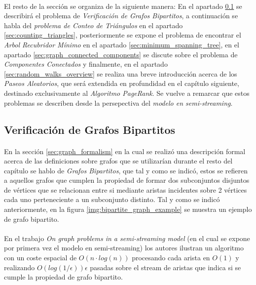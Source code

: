 \documentclass{subfiles}
\begin{document}
      \paragraph{}
      El resto de la sección se organiza de la siguiente manera: En el apartado \ref{sec:bipartite_matchings} se describirá el problema de \emph{Verificación de Grafos Bipartitos}, a continuación se habla del \emph{problema de Conteo de Triángulos} en el apartado \ref{sec:counting_triangles}, posteriormente se expone el problema de encontrar el \emph{Arbol Recubridor Mínimo} en el apartado \ref{sec:minimum_spanning_tree}, en el apartado \ref{sec:graph_connected_components} se discute sobre el problema de \emph{Componentes Conectados} y finalmente, en el apartado \ref{sec:random_walks_overview} se realiza una breve introducción acerca de los \emph{Paseos Aleatorios}, que será extendida en profundidad en el capítulo siguiente, destinado exclusivamente al \emph{Algoritmo PageRank}. Se vuelve a remarcar que estos problemas se describen desde la persepectiva del \emph{modelo en semi-streaming}.

      \subsection{Verificación de Grafos Bipartitos}
      \label{sec:bipartite_matchings}

        \paragraph{}
        En la sección \ref{sec:graph_formalism} en la cual se realizó una descripción formal acerca de las definiciones sobre grafos que se utilizarían durante el resto del capítulo se hablo de \emph{Grafos Bipartitos}, que tal y como se indicó, estos se refieren a aquellos grafos que cumplen la propiedad de formar dos subconjuntos disjuntos de vértices que se relacionan entre si mediante aristas incidentes sobre 2 vértices cada uno perteneciente a un subconjunto distinto. Tal y como se indicó anteriormente, en la figura \ref{img:bipartite_graph_example} se muestra un ejemplo de grafo bipartito.

        \paragraph{}
        En el trabajo \emph{On graph problems in a semi-streaming model}\cite{feigenbaum2005graph} (en el cual se expone por primera vez el modelo en semi-streaming) los autores ilustran un algoritmo con un coste espacial de $O(n \cdot log(n))$ procesando cada arista en $O(1)$ y realizando $O(log(1 / \epsilon)) \epsilon$ pasadas sobre el stream de aristas que indica si se cumple la propiedad de grafo bipartito.
\end{document}
